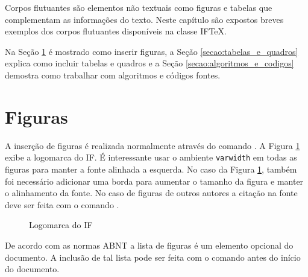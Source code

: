 Corpos flutuantes são elementos não textuais como figuras e tabelas que complementam as informações do texto. Neste capítulo são expostos breves exemplos dos corpos flutuantes disponíveis na classe {IF\TeX}.

Na Seção \ref{secao:figuras} é mostrado como inserir figuras, a Seção \ref{secao:tabelas_e_quadros} explica como incluir tabelas e quadros e a Seção \ref{secao:algoritmos_e_codigos} demostra como trabalhar com algoritmos e códigos fontes.

\section{Figuras}
\label{secao:figuras}

A inserção de figuras é realizada normalmente através do comando .
A Figura \ref{figura:logomarca_if} exibe a logomarca do IF.
É interessante usar o ambiente \texttt{varwidth} em todas as figuras para manter a fonte alinhada a esquerda.
No caso da Figura \ref{figura:logomarca_if}, também foi necessário adicionar uma borda para aumentar o tamanho da figura e manter o alinhamento da fonte.
No caso de figuras de outros autores a citação na fonte deve ser feita com o comando .

\begin{figure}[!htb] \centering
\caption{Logomarca do IF} \label{figura:logomarca_if}
\begin{varwidth}{\linewidth}
\end{varwidth}
\end{figure}

De acordo com as normas ABNT a lista de figuras é um elemento opcional do documento.
A inclusão de tal lista pode ser feita com o comando  antes do início do documento.

